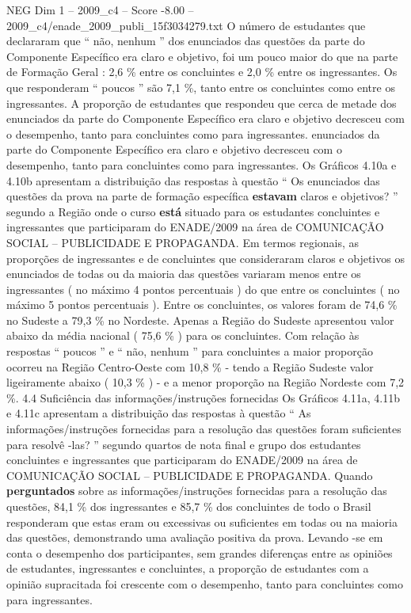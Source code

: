 \begin{textsample}{NEG Dim 1 – 2009\_c4 – Score -8.00 – 2009\_c4/enade\_2009\_publi\_15f3034279.txt}
O número de estudantes que declararam que “ não, nenhum ” dos enunciados das questões da parte do Componente Específico era claro e objetivo, foi um pouco maior do que na parte de Formação Geral : 2,6 \% entre os concluintes e 2,0 \% entre os ingressantes.
Os que responderam “ poucos ” são 7,1 \%, tanto entre os concluintes como entre os ingressantes.
A proporção de estudantes que respondeu que cerca de metade dos enunciados da parte do Componente Específico era claro e objetivo decresceu com o desempenho, tanto para concluintes como para ingressantes. enunciados da parte do Componente Específico era claro e objetivo decresceu com o desempenho, tanto para concluintes como para ingressantes.
Os Gráficos 4.10a e 4.10b apresentam a distribuição das respostas à questão “ Os enunciados das questões da prova na parte de formação específica \textbf{estavam} claros e objetivos? ” segundo a Região onde o curso \textbf{está} situado para os estudantes concluintes e ingressantes que participaram do ENADE/2009 na área de COMUNICAÇÃO SOCIAL – PUBLICIDADE E PROPAGANDA.
Em termos regionais, as proporções de ingressantes e de concluintes que consideraram claros e objetivos os enunciados de todas ou da maioria das questões variaram menos entre os ingressantes ( no máximo 4 pontos percentuais ) do que entre os concluintes ( no máximo 5 pontos percentuais ).
Entre os concluintes, os valores foram de 74,6 \% no Sudeste a 79,3 \% no Nordeste.
Apenas a Região do Sudeste apresentou valor abaixo da média nacional ( 75,6 \% ) para os concluintes.
Com relação às respostas “ poucos ” e “ não, nenhum ” para concluintes a maior proporção ocorreu na Região Centro-Oeste com 10,8 \% - tendo a Região Sudeste valor ligeiramente abaixo ( 10,3 \% ) - e a menor proporção na Região Nordeste com 7,2 \%. 4.4 Suficiência das informações/instruções fornecidas Os Gráficos 4.11a, 4.11b e 4.11c apresentam a distribuição das respostas à questão “ As informações/instruções fornecidas para a resolução das questões foram suficientes para resolvê -las? ” segundo quartos de nota final e grupo dos estudantes concluintes e ingressantes que participaram do ENADE/2009 na área de COMUNICAÇÃO SOCIAL – PUBLICIDADE E PROPAGANDA.
Quando \textbf{perguntados} sobre as informações/instruções fornecidas para a resolução das questões, 84,1 \% dos ingressantes e 85,7 \% dos concluintes de todo o Brasil responderam que estas eram ou excessivas ou suficientes em todas ou na maioria das questões, demonstrando uma avaliação positiva da prova.
Levando -se em conta o desempenho dos participantes, sem grandes diferenças entre as opiniões de estudantes, ingressantes e concluintes, a proporção de estudantes com a opinião supracitada foi crescente com o desempenho, tanto para concluintes como para ingressantes.

\end{textsample}
